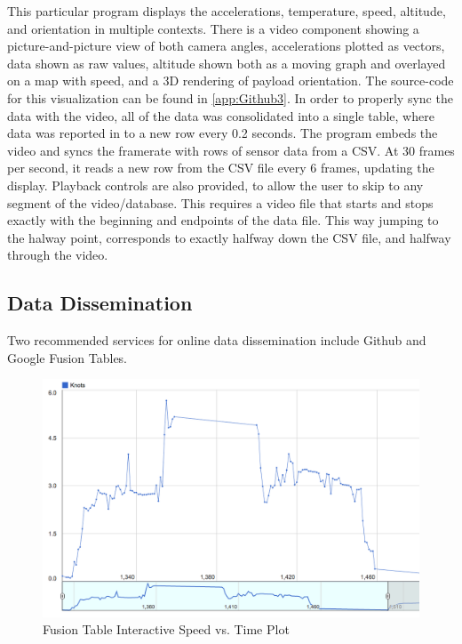 \documentclass[heading.tex]{subfiles}
\begin{document}
This particular program displays the accelerations, temperature, speed,
altitude, and orientation in multiple contexts. There is a video component
showing a picture-and-picture view of both camera angles, accelerations plotted
as vectors, data shown as raw values, altitude shown both as a moving graph and
overlayed on a map with speed, and a 3D rendering of payload orientation.
The source-code for this visualization can be found in \cref{app:Github3}.
In order to properly sync the data with the video, all of the data was consolidated
into a single table, where data was reported in to a new row every 0.2 seconds.
The program embeds the video and syncs the framerate with rows of sensor data
from a CSV. At 30 frames per second, it reads a new row from the CSV file every
6 frames, updating the display. Playback controls are also provided, to allow
the user to skip to any segment of the video/database. This requires a video
file that starts and stops exactly with the beginning and endpoints of the data
file. This way jumping to the halway point, corresponds to exactly halfway down
the CSV file, and halfway through the video.

\subsection{Data Dissemination}

Two recommended services for online data dissemination include Github and
Google Fusion Tables.

\begin{figure}
\centering
\includegraphics[width=1\textwidth]{images/speedPlot.png}
 \caption{Fusion Table Interactive Speed vs. Time Plot}
\label{f:plot}
\end{figure}
\end{document}
